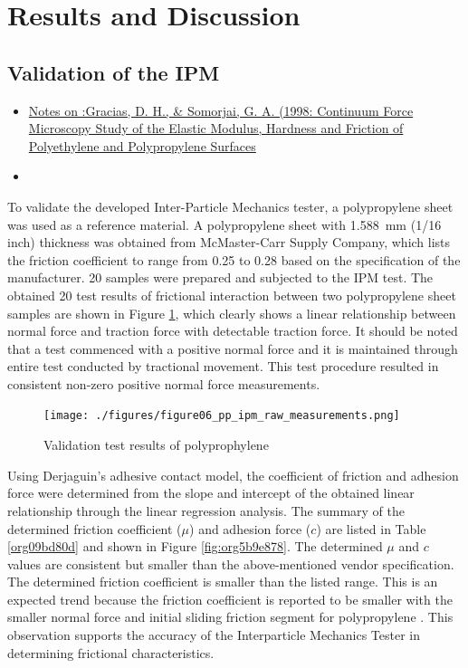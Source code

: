 \documentclass[xcolor=dvipsnames,10pt,hidelinks]{article}
\let\oldsubsection\subsection
\renewcommand{\subsection}{\clearpage\oldsubsection}
\begin{document}
\section{Results and Discussion}
\label{sec:orgbd9c396}
\subsection{Validation of the IPM}
\label{sec:org43f5a16}
\begin{itemize}
\item \parencite{gracias_continuum_1998}\href{../../../../../org/mindmap/gracias_continuum_1998.org}{Notes on :Gracias, D. H., \& Somorjai, G. A. (1998: Continuum Force Microscopy Study of the Elastic Modulus, Hardness and Friction of Polyethylene and Polypropylene Surfaces}
\item 
\end{itemize}

To validate the developed Inter-Particle Mechanics tester, a polypropylene sheet was used as a reference material.
A polypropylene sheet with \qty{1.588}{\milli\meter} (1/16 inch) thickness was obtained from McMaster-Carr Supply Company,
which lists the friction coefficient to range from 0.25 to 0.28 based on the specification of the manufacturer.
20 samples were prepared and subjected to the IPM test.
The obtained 20 test results of frictional interaction between two polypropylene sheet samples are shown in Figure \ref{fig:org6662da7},
which clearly shows a linear relationship between normal force and traction force with detectable traction force.
It should be noted that a test commenced with a positive normal force and it is maintained through entire test conducted by tractional movement.
This test procedure resulted in consistent non-zero positive normal force measurements.

\begin{figure}[htbp]
\centering
\texttt{[image: ./figures/figure06\_pp\_ipm\_raw\_measurements.png]}
\caption{\label{fig:org6662da7}Validation test results of polyprophylene}
\end{figure}

Using Derjaguin’s adhesive contact model,
the coefficient of friction and adhesion force were determined from the slope and intercept of the obtained linear relationship through the linear regression analysis. The summary of the determined friction coefficient (\(\mu\)) and adhesion force (\(c\)) are listed in Table \ref{org09bd80d} and shown in Figure \ref{fig:org5b9e878}.
The determined \(\mu\) and \(c\) values are consistent but smaller than the above-mentioned vendor specification.
The determined friction coefficient is smaller than the listed range.
This is an expected trend because the friction coefficient is reported to be smaller with the smaller normal force and initial sliding friction segment for polypropylene \parencite{gracias_continuum_1998,sedlak_effect_2017}.
This observation supports the accuracy of the Interparticle Mechanics Tester in determining frictional characteristics.
\end{document}
